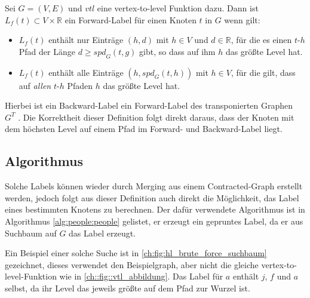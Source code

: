 \begin{definition}
  Sei $G = (V, E)$ und ${vtl}$ eine vertex-to-level Funktion dazu.
  Dann ist $L_f (t) \subset V \times \mathbb{R}$ ein Forward-Label für einen Knoten $t$ in $G$ wenn gilt:

  \begin{itemize}
    \item
          $L_f (t)$ enthält nur Einträge $(h, d)$ mit $h \in V$ und $d \in \mathbb{R}$, für die es einen $t$-$h$ Pfad der Länge $d \geq {spd}_G (t, g)$ gibt, so dass auf ihm $h$ das größte Level hat.

    \item
          $L_f (t)$ enthält alle Einträge $(h, {spd}_G (t, h))$ mit $h \in V$, für die gilt, dass auf \emph{allen} $t$-$h$ Pfaden $h$ das größte Level hat.
  \end{itemize}
\end{definition}


Hierbei ist ein Backward-Label ein Forward-Label des transponierten Graphen $G^T$ .
Die Korrektheit dieser Definition folgt direkt daraus, dass der Knoten mit dem höchsten Level auf einem Pfad im Forward- und Backward-Label liegt.

\subsection{Algorithmus}

Solche Labels können wieder durch Merging aus einem Contracted-Graph erstellt werden, jedoch folgt aus dieser Definition auch direkt die Möglichkeit, das Label eines bestimmten Knotens zu berechnen.
Der dafür verwendete Algorithmus ist in Algorithmus \ref{alg:people:people} gelistet, er erzeugt ein gepruntes Label, da er aus Suchbaum auf $G$ das Label erzeugt.

Ein Beispiel einer solche Suche ist in \autoref{ch:fig:hl_brute_force_suchbaum} gezeichnet, dieses verwendet den Beispielgraph, aber nicht die gleiche vertex-to-level-Funktion wie in \autoref{ch::fig::vtl_abbildung}.
Das Label für $a$ enthält $j$, $f$ und $a$ selbst, da ihr Level das jeweils größte auf dem Pfad zur Wurzel ist.

